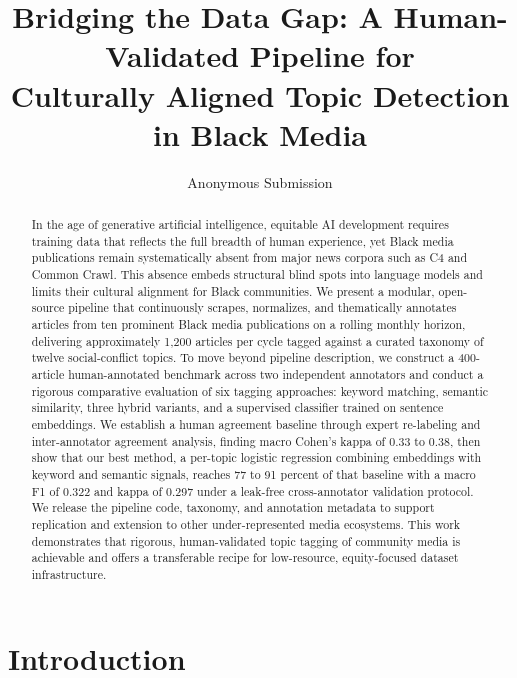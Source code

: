 \documentclass[letterpaper]{article}
\title{Bridging the Data Gap: A Human-Validated Pipeline for\\
Culturally Aligned Topic Detection in Black Media}
\author{
    Anonymous Submission
}
\begin{document}
\maketitle

\begin{abstract}
In the age of generative artificial intelligence, equitable AI development
requires training data that reflects the full breadth of human experience,
yet Black media publications remain systematically absent from major news
corpora such as C4 and Common Crawl. This absence embeds structural blind
spots into language models and limits their cultural alignment for Black
communities. We present a modular, open-source pipeline that continuously
scrapes, normalizes, and thematically annotates articles from ten prominent
Black media publications on a rolling monthly horizon, delivering
approximately 1,200 articles per cycle tagged against a curated taxonomy of
twelve social-conflict topics. To move beyond pipeline description, we
construct a 400-article human-annotated benchmark across two independent
annotators and conduct a rigorous comparative evaluation of six tagging
approaches: keyword matching, semantic similarity, three hybrid variants,
and a supervised classifier trained on sentence embeddings. We establish a
human agreement baseline through expert re-labeling and inter-annotator
agreement analysis, finding macro Cohen's kappa of 0.33 to 0.38, then show
that our best method, a per-topic logistic regression combining embeddings
with keyword and semantic signals, reaches 77 to 91 percent of that
baseline with a macro F1 of 0.322 and kappa of 0.297 under a leak-free
cross-annotator validation protocol. We release the pipeline code, taxonomy,
and annotation metadata to support replication and extension to other
under-represented media ecosystems. This work demonstrates that rigorous,
human-validated topic tagging of community media is achievable and offers a
transferable recipe for low-resource, equity-focused dataset infrastructure.
\end{abstract}

\section{Introduction}
\end{document}
